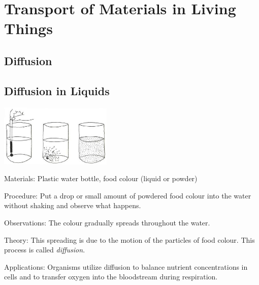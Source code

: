 \section{Transport of Materials in Living Things} 

\begin{multicols}{2}


\section*{Diffusion} 


\subsection{Diffusion in Liquids}

\begin{center}
\includegraphics[width=0.4\textwidth]{./img/vso/diffusion.jpg}
\end{center}

\begin{description*}
\item[Materials:]{Plastic water bottle, food colour (liquid or powder)}
\item[Procedure:]{Put a drop or small amount of powdered food colour into the water without shaking and observe what happens.}
\item[Observations:]{The colour gradually spreads throughout the water.}
\item[Theory:]{This spreading is due to the motion of the particles of food colour. This process is called \emph{diffusion}.}
\item[Applications:]{Organisms utilize diffusion to balance nutrient concentrations in cells and to transfer oxygen into the bloodstream during respiration.}
\end{description*}


\end{multicols}
